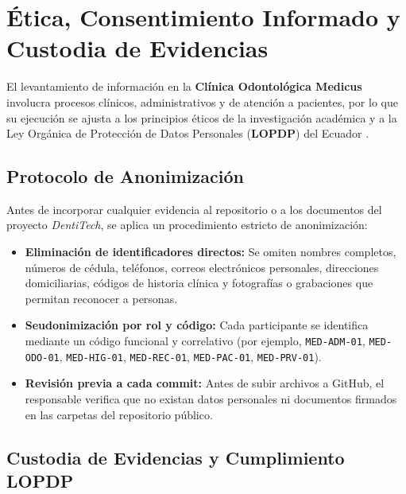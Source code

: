 
\section{{\'E}tica, Consentimiento Informado y Custodia de Evidencias}

El levantamiento de informaci{\'o}n en la \textbf{Cl{\'i}nica Odontol{\'o}gica Medicus} involucra procesos cl{\'i}nicos, administrativos y de atenci{\'o}n a pacientes, por lo que su ejecuci{\'o}n se ajusta a los principios {\'e}ticos de la investigaci{\'o}n acad{\'e}mica y a la Ley Org{\'a}nica de Protecci{\'o}n de Datos Personales (\textbf{LOPDP}) del Ecuador \cite{lopdp2021, reglamento_lopdp2023}.

\subsection{Protocolo de Anonimizaci{\'o}n}

Antes de incorporar cualquier evidencia al repositorio o a los documentos del proyecto \textit{DentiTech}, se aplica un procedimiento estricto de anonimizaci{\'o}n:

\begin{itemize}
    \item \textbf{Eliminaci{\'o}n de identificadores directos:} Se omiten nombres completos, n{\'u}meros de c{\'e}dula, tel{\'e}fonos, correos electr{\'o}nicos personales, direcciones domiciliarias, c{\'o}digos de historia cl{\'i}nica y fotograf{\'i}as o grabaciones que permitan reconocer a personas.
    \item \textbf{Seudonimizaci{\'o}n por rol y c{\'o}digo:} Cada participante se identifica mediante un c{\'o}digo funcional y correlativo (por ejemplo, \texttt{MED-ADM-01}, \texttt{MED-ODO-01}, \texttt{MED-HIG-01}, \texttt{MED-REC-01}, \texttt{MED-PAC-01}, \texttt{MED-PRV-01}).
    \item \textbf{Revisi{\'o}n previa a cada commit:} Antes de subir archivos a GitHub, el responsable verifica que no existan datos personales ni documentos firmados en las carpetas del repositorio p{\'u}blico.
\end{itemize}

\subsection{Custodia de Evidencias y Cumplimiento LOPDP}

